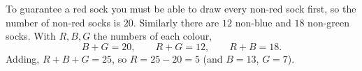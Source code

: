 To guarantee a red sock you must be able to draw every non-red sock first, so the number of non-red socks is $20$. Similarly there are $12$ non-blue and $18$ non-green socks. With $R,B,G$ the numbers of each colour,
\[B+G=20,\qquad R+G=12,\qquad R+B=18.\]
Adding, $R+B+G=25$, so $R=25-20=\boxed{5}$ (and $B=13$, $G=7$).
